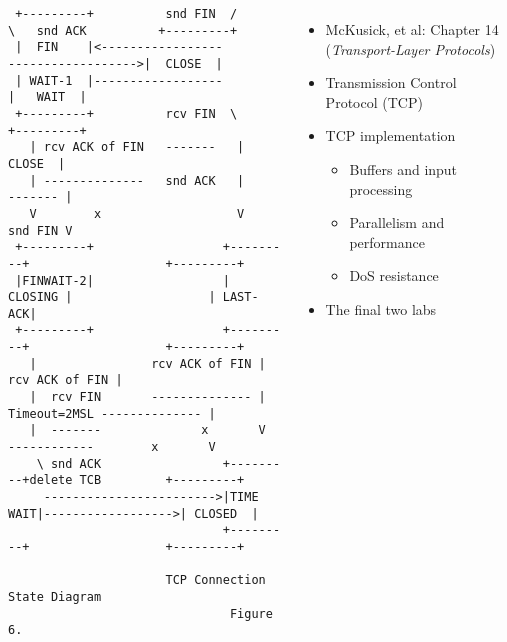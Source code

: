 \begin{frame}[fragile]
\begin{columns}[T]
\begin{Tiny}
\begin{verbatim}
 +---------+          snd FIN  /       \   snd ACK          +---------+
 |  FIN    |<-----------------           ------------------>|  CLOSE  |
 | WAIT-1  |------------------                              |   WAIT  |
 +---------+          rcv FIN  \                            +---------+
   | rcv ACK of FIN   -------   |                            CLOSE  |  
   | --------------   snd ACK   |                           ------- |  
   V        x                   V                           snd FIN V  
 +---------+                  +---------+                   +---------+
 |FINWAIT-2|                  | CLOSING |                   | LAST-ACK|
 +---------+                  +---------+                   +---------+
   |                rcv ACK of FIN |                 rcv ACK of FIN |  
   |  rcv FIN       -------------- |    Timeout=2MSL -------------- |  
   |  -------              x       V    ------------        x       V  
    \ snd ACK                 +---------+delete TCB         +---------+
     ------------------------>|TIME WAIT|------------------>| CLOSED  |
                              +---------+                   +---------+

                      TCP Connection State Diagram
                               Figure 6.
\end{verbatim}
  \end{Tiny}


    \pause

    \begin{itemize}
      \item McKusick, et al: Chapter 14 (\textit{Transport-Layer Protocols})

      \medskip
      \pause

      \item Transmission Control Protocol (TCP)
      \item TCP implementation
      \begin{itemize}
	\item Buffers and input processing
	\item Parallelism and performance
	\item DoS resistance
      \end{itemize}

      \medskip
      \pause

      \item The final two labs
    \end{itemize}
  \end{columns}

\end{frame}


